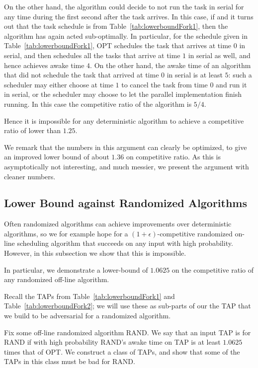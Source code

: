 On the other hand, the algorithm could decide to not run the task
in serial for any time during the first second after the task
arrives. In this case, if
and it turns out that the task schedule is from
Table~\ref{tab:lowerboundFork1}, then the algorithm has again
acted sub-optimally. In particular, for the schedule given in
Table~\ref{tab:lowerboundFork1}, OPT schedules the task that
arrives at time $0$ in serial, and then schedules all the tasks
that arrive at time $1$ in serial as well, and hence achieves
awake time $4$. On the other hand, the awake time of an algorithm
that did not schedule the task that arrived at time $0$ in
serial is at least $5$: such a scheduler may either choose at
time $1$ to cancel the task from time $0$ and run it in serial,
or the scheduler may choose to let the parallel implementation
finish running. In this case the competitive ratio of the
algorithm is $5/4$.

Hence it is impossible for any deterministic algorithm to achieve
a competitive ratio of lower than $1.25$.

We remark that the numbers in this argument can clearly be
optimized, to give an improved lower bound of about $1.36$ on
competitive ratio. As this is asymptotically not interesting, and
much messier, we present the argument with cleaner numbers.

\subsection{Lower Bound against Randomized Algorithms}
Often randomized algorithms can achieve improvements over
deterministic algorithms, so we for example hope for a
$(1+\epsilon)$-competitive randomized on-line scheduling
algorithm that succeeds on any input with high probability.
However, in this subsection we show that this is impossible.

In particular, we demonstrate a lower-bound of $1.0625$ on the
competitive ratio of any randomized off-line algorithm.

Recall the TAPs from Table~\ref{tab:lowerboundFork1} and
Table~\ref{tab:lowerboundFork2}; we will use these as sub-parts
of our the TAP that we build to be adversarial for a randomized
algorithm. 

Fix some off-line randomized algorithm RAND. We say that an input
TAP is  for RAND if with high probability RAND's awake
time on TAP is at least $1.0625$ times that of OPT.
We construct a class of TAPs, and show that some of the TAPs in
this class must be bad for RAND.

